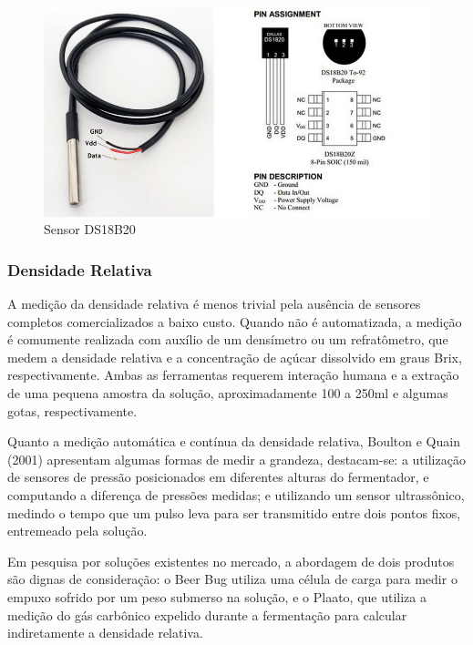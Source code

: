 \begin{figure}[h]
    \centering
    \includegraphics[scale=0.35]{figuras/projeto/hardware/ds18b20.jpg}
    \caption{Sensor DS18B20}
    \label{fig:ds18b20}
\end{figure}

\subsubsection{Densidade Relativa}

A medição da densidade relativa é menos trivial pela ausência de sensores completos comercializados a baixo custo. Quando não é automatizada, a medição é comumente  realizada com auxílio de um densímetro ou um refratômetro, que medem a densidade relativa e a concentração de açúcar dissolvido em graus Brix, respectivamente. Ambas as ferramentas requerem interação humana e a extração de uma pequena amostra da solução, aproximadamente 100 a 250ml e algumas gotas, respectivamente.


Quanto a medição automática e contínua da densidade relativa, Boulton e Quain (2001) apresentam algumas formas de medir a grandeza, destacam-se: a utilização de sensores de pressão posicionados em diferentes alturas do fermentador, e computando a diferença de pressões medidas; e utilizando um sensor ultrassônico,  medindo o tempo que um pulso leva para ser transmitido entre dois pontos fixos, entremeado pela solução. 


Em pesquisa por soluções existentes no mercado, a abordagem de dois produtos são dignas de consideração: o Beer Bug utiliza uma célula de carga para medir o empuxo sofrido por um peso submerso na solução, e o Plaato, que utiliza a medição do gás carbônico expelido durante a fermentação para calcular indiretamente a densidade relativa.


